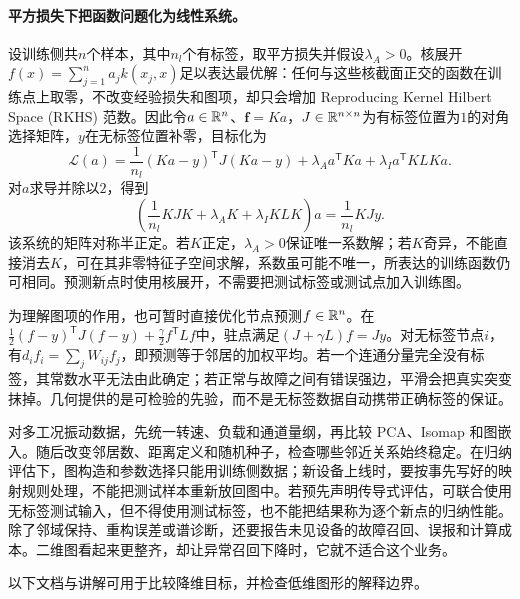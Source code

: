 \paragraph{平方损失下把函数问题化为线性系统。}
设训练侧共$n$个样本，其中$n_l$个有标签，取平方损失并假设$\lambda_A>0$。核展开$f(x)=\sum_{j=1}^na_jk(x_j,x)$足以表达最优解：任何与这些核截面正交的函数在训练点上取零，不改变经验损失和图项，却只会增加 Reproducing Kernel Hilbert Space (RKHS) 范数。因此令$a\in\mathbb{R}^n$、$\bm f=Ka$，$J\in\mathbb{R}^{n\times n}$为有标签位置为$1$的对角选择矩阵，$y$在无标签位置补零，目标化为
\begin{equation}
 \mathcal L(a)=\frac1{n_l}(Ka-y)^{\mathsf T}J(Ka-y)
 +\lambda_Aa^{\mathsf T}Ka+\lambda_Ia^{\mathsf T}KLKa.
\end{equation}
对$a$求导并除以$2$，得到
\begin{equation}
 \left(\frac1{n_l}KJK+\lambda_AK+\lambda_IKLK\right)a
 =\frac1{n_l}KJy.
\end{equation}
该系统的矩阵对称半正定。若$K$正定，$\lambda_A>0$保证唯一系数解；若$K$奇异，不能直接消去$K$，可在其非零特征子空间求解，系数虽可能不唯一，所表达的训练函数仍可相同。预测新点时使用核展开，不需要把测试标签或测试点加入训练图。

为理解图项的作用，也可暂时直接优化节点预测$f\in\mathbb{R}^n$。在$\frac12(f-y)^{\mathsf T}J(f-y)+\frac\gamma2f^{\mathsf T}Lf$中，驻点满足$(J+\gamma L)f=Jy$。对无标签节点$i$，有$d_if_i=\sum_jW_{ij}f_j$，即预测等于邻居的加权平均。若一个连通分量完全没有标签，其常数水平无法由此确定；若正常与故障之间有错误强边，平滑会把真实突变抹掉。几何提供的是可检验的先验，而不是无标签数据自动携带正确标签的保证。

对多工况振动数据，先统一转速、负载和通道量纲，再比较 PCA、Isomap 和图嵌入。随后改变邻居数、距离定义和随机种子，检查哪些邻近关系始终稳定。在归纳评估下，图构造和参数选择只能用训练侧数据；新设备上线时，要按事先写好的映射规则处理，不能把测试样本重新放回图中。若预先声明传导式评估，可联合使用无标签测试输入，但不得使用测试标签，也不能把结果称为逐个新点的归纳性能。除了邻域保持、重构误差或谱诊断，还要报告未见设备的故障召回、误报和计算成本。二维图看起来更整齐，却让异常召回下降时，它就不适合这个业务。

以下文档与讲解可用于比较降维目标，并检查低维图形的解释边界。
